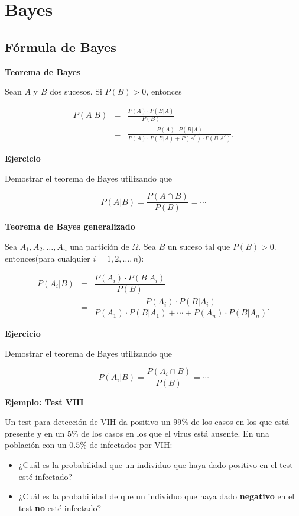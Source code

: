 \documentclass[]{book}
\providecommand{\tightlist}{%
  \setlength{\itemsep}{0pt}\setlength{\parskip}{0pt}}
\begin{document}
\hypertarget{bayes}{%
\section{Bayes}\label{bayes}}

\hypertarget{fuxf3rmula-de-bayes}{%
\subsection{Fórmula de Bayes}\label{fuxf3rmula-de-bayes}}

\textbf{Teorema de Bayes}

Sean \(A\) y \(B\) dos sucesos. Si \(P(B)>0\), entonces

\begin{eqnarray*}
P(A|B) & = & \frac{P(A)\cdot P(B\big|A)}{P(B)}\\
&=& \frac{P(A)\cdot P(B\big|A)}{P(A)\cdot P(B\big|A)+P(A^c)\cdot P(B\big|A^c)}.
\end{eqnarray*}

\textbf{Ejercicio}

Demostrar el teorema de Bayes utilizando que

\[P(A|B) =\frac{P(A\cap B)}{P(B)}=\cdots\]

\textbf{Teorema de Bayes generalizado}

Sea \(A_1,A_2,\ldots,A_n\) una partición de \(\Omega\). Sea \(B\) un suceso tal que \(P(B)>0\). entonces(para cualquier \(i=1,2,\ldots,n\)):

\begin{eqnarray*}
P(A_i|B) & =& \dfrac{P(A_i)\cdot P(B|A_i)}{P(B)}\\
& =& \dfrac{P(A_i)\cdot P(B|A_i)}{P(A_1)\cdot P(B|A_1)+\cdots+P(A_n)\cdot P(B|A_n)}.
\end{eqnarray*}

\textbf{Ejercicio}

Demostrar el teorema de Bayes utilizando que

\[P(A_i|B) =\dfrac{P(A_i\cap B)}{P(B)}=\cdots\]

\textbf{Ejemplo: Test VIH}

Un test para detección de VIH da positivo un 99\% de los casos en los que está presente y en un 5\% de los casos en los que el virus está ausente. En una población con un \(0.5\%\) de infectados por VIH:

\begin{itemize}
\tightlist
\item
  ¿Cuál es la probabilidad que un individuo que haya dado positivo en el test esté infectado?
\item
  ¿Cuál es la probabilidad de que un individuo que haya dado \textbf{negativo} en el test \textbf{no} esté infectado?
\end{itemize}
\end{document}
